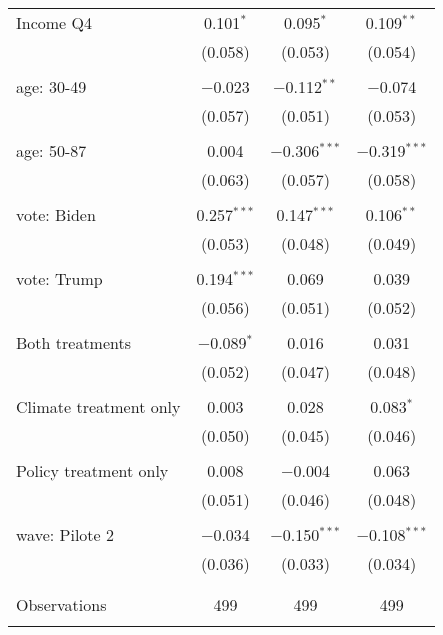 \begin{tabular}{@{\extracolsep{5pt}}lccc}
 Income Q4 & 0.101$^{*}$ & 0.095$^{*}$ & 0.109$^{**}$ \\ 
  & (0.058) & (0.053) & (0.054) \\ 
  & & & \\ 
 age: 30-49 & $-$0.023 & $-$0.112$^{**}$ & $-$0.074 \\ 
  & (0.057) & (0.051) & (0.053) \\ 
  & & & \\ 
 age: 50-87 & 0.004 & $-$0.306$^{***}$ & $-$0.319$^{***}$ \\ 
  & (0.063) & (0.057) & (0.058) \\ 
  & & & \\ 
 vote: Biden & 0.257$^{***}$ & 0.147$^{***}$ & 0.106$^{**}$ \\ 
  & (0.053) & (0.048) & (0.049) \\ 
  & & & \\ 
 vote: Trump & 0.194$^{***}$ & 0.069 & 0.039 \\ 
  & (0.056) & (0.051) & (0.052) \\ 
  & & & \\ 
 Both treatments & $-$0.089$^{*}$ & 0.016 & 0.031 \\ 
  & (0.052) & (0.047) & (0.048) \\ 
  & & & \\ 
 Climate treatment only & 0.003 & 0.028 & 0.083$^{*}$ \\ 
  & (0.050) & (0.045) & (0.046) \\ 
  & & & \\ 
 Policy treatment only & 0.008 & $-$0.004 & 0.063 \\ 
  & (0.051) & (0.046) & (0.048) \\ 
  & & & \\ 
 wave: Pilote 2 & $-$0.034 & $-$0.150$^{***}$ & $-$0.108$^{***}$ \\ 
  & (0.036) & (0.033) & (0.034) \\ 
  & & & \\ 
\hline \\[-1.8ex] 

Observations & 499 & 499 & 499 \\ 
\hline 
\hline \\[-1.8ex] 
\end{tabular} 